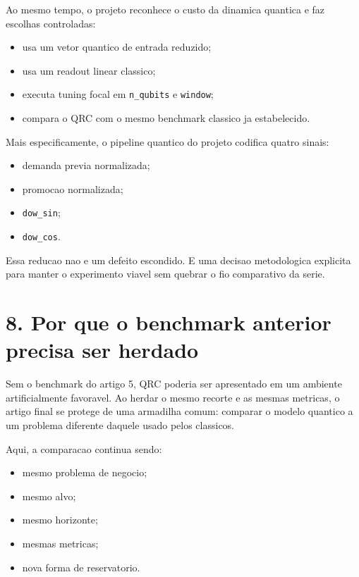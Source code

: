 \documentclass[12pt]{article}
\providecommand{\tightlist}{%
  \setlength{\itemsep}{0pt}\setlength{\parskip}{0pt}}
\begin{document}
Ao mesmo tempo, o projeto reconhece o custo da dinamica quantica e faz escolhas controladas:

\begin{itemize}
\tightlist
\item
  usa um vetor quantico de entrada reduzido;
\item
  usa um readout linear classico;
\item
  executa tuning focal em \texttt{n\_qubits} e \texttt{window};
\item
  compara o QRC com o mesmo benchmark classico ja estabelecido.
\end{itemize}

Mais especificamente, o pipeline quantico do projeto codifica quatro sinais:

\begin{itemize}
\tightlist
\item
  demanda previa normalizada;
\item
  promocao normalizada;
\item
  \texttt{dow\_sin};
\item
  \texttt{dow\_cos}.
\end{itemize}

Essa reducao nao e um defeito escondido. E uma decisao metodologica explicita para manter o experimento viavel sem quebrar o fio comparativo da serie.

\section{8. Por que o benchmark anterior precisa ser herdado}\label{8-por-que-o-benchmark-anterior-precisa-ser-herdado}

Sem o benchmark do artigo 5, QRC poderia ser apresentado em um ambiente artificialmente favoravel. Ao herdar o mesmo recorte e as mesmas metricas, o artigo final se protege de uma armadilha comum: comparar o modelo quantico a um problema diferente daquele usado pelos classicos.

Aqui, a comparacao continua sendo:

\begin{itemize}
\tightlist
\item
  mesmo problema de negocio;
\item
  mesmo alvo;
\item
  mesmo horizonte;
\item
  mesmas metricas;
\item
  nova forma de reservatorio.
\end{itemize}
\end{document}
